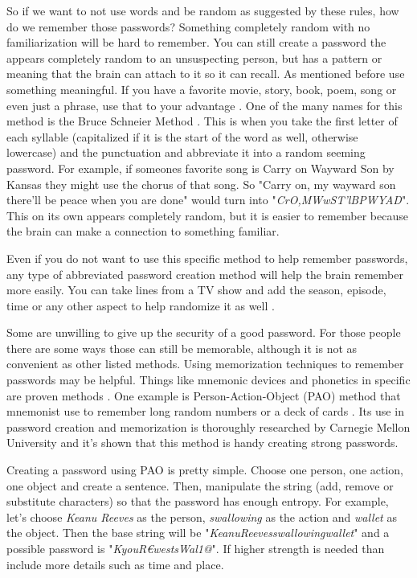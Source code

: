 \documentclass[acmsmall,nonacm]{acmart}
\begin{document}
So if we want to not use words and be random as suggested by these rules, how do we remember those passwords? Something completely random with no familiarization will be hard to remember. You can still create a password the appears completely random to an unsuspecting person, but has a pattern or meaning that the brain can attach to it so it can recall. As mentioned before use something meaningful. If you have a favorite movie, story, book, poem, song or even just a phrase, use that to your advantage \cite{lee_2014,rubenking_2021}. One of the many names for this method is the Bruce Schneier Method \cite{lee_2014}. This is when you take the first letter of each syllable (capitalized if it is the start of the word as well, otherwise lowercase) and the punctuation and abbreviate it into a random seeming password. For example, if someones favorite song is Carry on Wayward Son by Kansas they might use the chorus of that song. So "Carry on, my wayward son there'll be peace when you are done" would turn into "\emph{CrO,MWwST'lBPWYAD}". This on its own appears completely random, but it is easier to remember because the brain can make a connection to something familiar. 

Even if you do not want to use this specific method to help remember passwords, any type of abbreviated password creation method will help the brain remember more easily. You can take lines from a TV show and add the season, episode, time or any other aspect to help randomize it as well \cite{rubenking_2021}. 

Some are unwilling to give up the security of a good password. For those people there are some ways those can still be memorable, although it is not as convenient as other listed methods. Using memorization techniques to remember passwords may be helpful. Things like mnemonic devices and phonetics in specific are proven methods \cite{rubenking_2021}. 
One example is Person-Action-Object (PAO) method that mnemonist use to remember long random numbers or a deck of cards \cite{pao_wiki}. Its use in password creation and memorization is thoroughly researched by Carnegie Mellon University \cite{blocki_2013} and it's shown that this method is handy creating strong passwords.

Creating a password using PAO is pretty simple. Choose one person, one action, one object and create a sentence. Then, manipulate the string (add, remove or substitute characters) so that the password has enough entropy. For example, let's choose \emph{Keanu Reeves} as the person, \emph{swallowing} as the action and \emph{wallet} as the object. Then the base string will be "\emph{KeanuReevesswallowingwallet}" and a possible password is "\emph{KyouR€westsWal1@}". If higher strength is needed than include more details such as time and place. 
\end{document}
